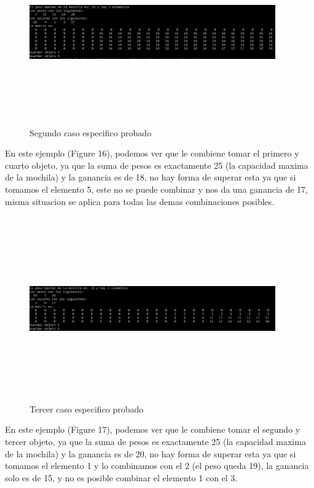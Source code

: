\documentclass[spanish]{article}
\begin{document}
 		\begin{figure}[H]
 			\centering
 			\includegraphics[width=400px,height=300px]{casoEspecifico2}
 			\caption{Segundo caso especifico probado}
 		\end{figure}
 		En este ejemplo (Figure 16), podemos ver que le combiene tomar el primero y cuarto objeto, ya que la suma de pesos es exactamente 25 (la capacidad maxima de la mochila) y la ganancia es de 18, no hay forma de superar esta ya que si tomamos el elemento 5, este no se puede combinar y nos da una ganancia de 17, misma situacion se aplica para todas las demas combinaciones posibles.
 		\begin{figure}[H]
 			\centering
 			\includegraphics[width=400px,height=300px]{casoEspecifico3}
 			\caption{Tercer caso especifico probado}
 		\end{figure}
 		En este ejemplo (Figure 17), podemos ver que le combiene tomar el segundo y tercer objeto, ya que la suma de pesos es exactamente 25 (la capacidad maxima de la mochila) y la ganancia es de 20, no hay forma de superar esta ya que si tomamos el elemento 1 y lo combinamos con el 2 (el peso queda 19), la ganancia solo es de 15, y no es posible combinar el elemento 1 con el 3.
\end{document}
